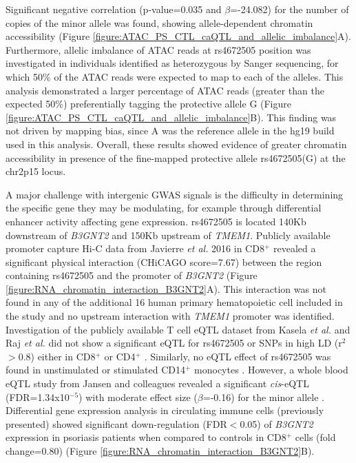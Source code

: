Significant negative correlation (p-value=0.035 and $\beta$=-24.082) for the number of copies of the minor allele was found, showing allele-dependent chromatin accessibility (Figure \ref{figure:ATAC_PS_CTL_caQTL_and_allelic_imbalance}A). Furthermore, allelic imbalance of ATAC reads at rs4672505 position was investigated in individuals identified as heterozygous by Sanger sequencing, for which 50\% of the ATAC reads were expected to map to each of the alleles. This analysis demonstrated a larger percentage of ATAC reads (greater than the expected 50\%) preferentially tagging the protective allele G (Figure \ref{figure:ATAC_PS_CTL_caQTL_and_allelic_imbalance}B). This finding was not driven by mapping bias, since A was the reference allele in the hg19 build used in this analysis. Overall, these results showed evidence of greater chromatin accessibility in presence of the fine-mapped protective allele rs4672505(G) at the chr2p15 locus.
 

A major challenge with intergenic GWAS signals is the difficulty in determining the specific gene they may be modulating, for example through differential enhancer activity affecting gene expression. rs4672505 is located 140Kb downstream of \textit{B3GNT2} and 150Kb upstream of \textit{TMEM1}. Publicly available promoter capture Hi-C data from Javierre \textit{et al.} 2016 in CD8$^+$ revealed a significant physical interaction (CHiCAGO score=7.67) between the region containing rs4672505 and the promoter of \textit{B3GNT2} (Figure \ref{figure:RNA_chromatin_interaction_B3GNT2}A). This interaction was not found in any of the additional 16 human primary hematopoietic cell included in the study and no upstream interaction with \textit{TMEM1} promoter was identified. Investigation of the publicly available T cell eQTL dataset from Kasela \textit{et al.} and Raj \textit{et al.} did not show a significant eQTL for rs4672505 or SNPs in high LD (r$^2$$>$0.8) either in CD8$^+$ or CD4$^+$ \parencite{Raj2014,Kasela2017}. Similarly, no eQTL effect of rs4672505 was found in unstimulated or stimulated CD14$^+$ monocytes \parencite{Fairfax2014}. However, a whole blood eQTL study from Jansen and colleagues revealed a significant \textit{cis}-eQTL (FDR=1.34x10$^{-5}$) with moderate effect size ($\beta$=-0.16) for the minor allele \parencite{Jansen2017}. Differential gene expression analysis in circulating immune cells (previously presented) showed significant down-regulation (FDR$<$0.05) of \textit{B3GNT2} expression in psoriasis patients when compared to controls in CD8$^+$ cells (fold change=0.80) (Figure \ref{figure:RNA_chromatin_interaction_B3GNT2}B). 

